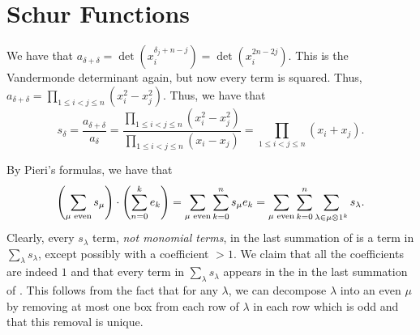\documentclass[letterpaper, 11pt, oneside]{book}
\begin{document}
\clearpage

\section{Schur Functions}

\begin{sol}\label{ex:Manivel_1.2.4}
  We have that $a_{\delta + \delta} = \det(x_{i}^{\delta_{j} + n - j}) = \det(x_{i}^{2n - 2j})$.
  This is the Vandermonde determinant again, but now every term is squared.
  Thus, $a_{\delta + \delta} = \prod_{1 \leq i < j \leq n} (x_{i}^{2} - x_{j}^{2})$.
  Thus, we have that
  \[
    s_{\delta} = \frac{a_{\delta + \delta}}{a_{\delta}} = \frac{\prod_{1 \leq i < j \leq n} (x_{i}^{2} - x_{j}^{2})}{\prod_{1 \leq i < j \leq n} (x_{i} - x_{j})} = \prod_{1 \leq i < j \leq n} (x_{i} + x_{j}).
  \]
\end{sol}

\begin{sol}\label{ex:Manivel_1.2.7}
  By Pieri's formulas, we have that
  \begin{equation}\label{eq:Pieri_even_expansion}
    \pqty{\sum_{\mu \text{ even}} s_{\mu}} \cdot \pqty{\sum_{n = 0}^{k} e_{k}} = \sum_{\mu \text{ even}} \sum_{k = 0}^{n} s_{\mu} e_{k} = \sum_{\mu \text{ even}} \sum_{k = 0}^{n} \sum_{\lambda \in \mu \otimes 1^{k}} s_{\lambda}.
  \end{equation}
  Clearly, every $s_{\lambda}$ term, \emph{not monomial terms}, in the last summation of  is a term in $\sum_{\lambda} s_{\lambda}$, except possibly with a coefficient $> 1$.
  We claim that all the coefficients are indeed $1$ and that every term in $\sum_{\lambda} s_{\lambda}$ appears in the in the last summation of .
  This follows from the fact that for any $\lambda$, we can decompose $\lambda$ into an even $\mu$ by removing at most one box from each row of $\lambda$ in each row which is odd and that this removal is unique.
\end{sol}
\end{document}
